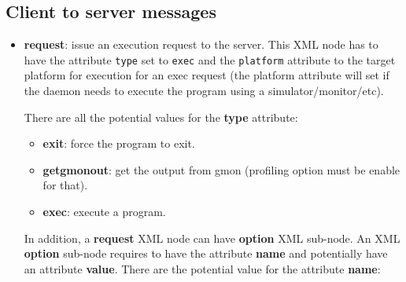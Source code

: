\documentclass[11pt]{book}
\begin{document}
      \subsection{Client to server messages}
      \begin{itemize}
         \item
            \textbf{request}: issue an execution request to the server. This
            XML node has to have the attribute \texttt{type} set to
            \texttt{exec} and the \texttt{platform} attribute to the target 
            platform for execution for an exec request (the platform attribute will set if the
            daemon needs to execute the program using a simulator/monitor/etc).

            There are all the potential values for the \textbf{type} attribute:
            \begin{itemize}
               \item
                  \textbf{exit}: force the program to exit.
               \item
                  \textbf{getgmonout}: get the output from gmon (profiling
                  option must be enable for that).
               \item
                  \textbf{exec}: execute a program.
            \end{itemize}

            In addition, a \textbf{request} XML node can have \textbf{option}
            XML sub-node. An XML \textbf{option} sub-node requires to have the
            attribute \textbf{name} and potentially have an attribute
            \textbf{value}. There are the potential value for the attribute
            \textbf{name}:


\end{itemize}
\end{document}
